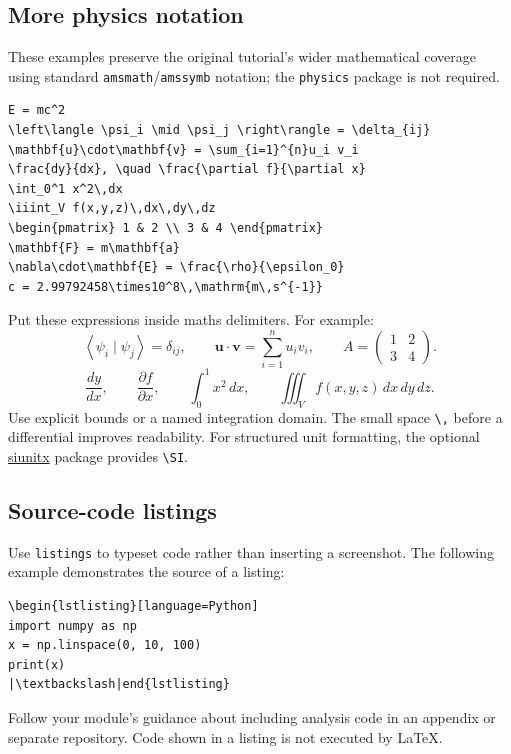 \documentclass[11pt]{article}
\begin{document}
\subsection{More physics notation}
These examples preserve the original tutorial's wider mathematical coverage
using standard \texttt{amsmath}/\texttt{amssymb} notation; the
\texttt{physics} package is not required.
\begin{lstlisting}
E = mc^2
\left\langle \psi_i \mid \psi_j \right\rangle = \delta_{ij}
\mathbf{u}\cdot\mathbf{v} = \sum_{i=1}^{n}u_i v_i
\frac{dy}{dx}, \quad \frac{\partial f}{\partial x}
\int_0^1 x^2\,dx
\iiint_V f(x,y,z)\,dx\,dy\,dz
\begin{pmatrix} 1 & 2 \\ 3 & 4 \end{pmatrix}
\mathbf{F} = m\mathbf{a}
\nabla\cdot\mathbf{E} = \frac{\rho}{\epsilon_0}
c = 2.99792458\times10^8\,\mathrm{m\,s^{-1}}
\end{lstlisting}
Put these expressions inside maths delimiters. For example:
\[
 \left\langle \psi_i \mid \psi_j \right\rangle=\delta_{ij},
 \qquad
 \mathbf{u}\cdot\mathbf{v}=\sum_{i=1}^{n}u_i v_i,
 \qquad
 A=\begin{pmatrix}1&2\\3&4\end{pmatrix}.
\]
\[
 \frac{dy}{dx},\qquad
 \frac{\partial f}{\partial x},\qquad
 \int_0^1 x^2\,dx,\qquad
 \iiint_V f(x,y,z)\,dx\,dy\,dz.
\]
Use explicit bounds or a named integration domain. The small space
\verb|\,| before a differential improves readability.
For structured unit formatting, the optional
\href{https://ctan.org/pkg/siunitx}{siunitx} package provides \verb|\SI|.

\subsection{Source-code listings}
Use \texttt{listings} to typeset code rather than inserting a screenshot.
The following example demonstrates the source of a listing:
\begin{lstlisting}[escapechar=|]
\begin{lstlisting}[language=Python]
import numpy as np
x = np.linspace(0, 10, 100)
print(x)
|\textbackslash|end{lstlisting}
\end{lstlisting}
Follow your module's guidance about including analysis code in an appendix
or separate repository. Code shown in a listing is not executed by LaTeX.
\end{document}
